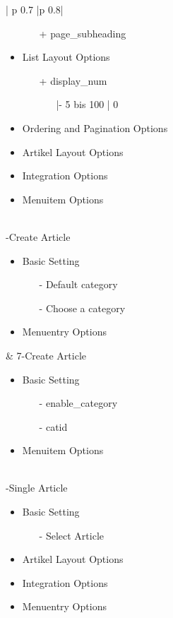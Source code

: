 \begin{minipage}{0.7\textwidth}
\begin{longtable}{| p {0.7\textwidth} |p {0.8\textwidth}|}
\begin{itemize}
\begin{enumerate}
	 \item[+] page\_subheading
	\end{enumerate}
\item List Layout Options
\begin{enumerate}
   	   	\item[+] display\_num
   	   	\begin{enumerate}
   	   				\item[|-] 5 bis 100 | 0
   	   			\end{enumerate}
   	   	\end{enumerate}
\item Ordering and Pagination Options
\item Artikel Layout Options
\item Integration Options
\item Menuitem Options 
\end{itemize}
\\ -Create Article
\begin{itemize}
\item Basic Setting
	\begin{enumerate}
			\item[-] Default category 
			\item[-] Choose a category 
	 \end{enumerate}
\item Menuentry Options
\end{itemize}
&
7-Create Article
\begin{itemize}
\item Basic Setting
	\begin{enumerate}
			\item[-] enable\_category 
			\item[-] catid 
	 \end{enumerate}
\item Menuitem Options
\end{itemize}
\\ -Single Article
\begin{itemize}
	\item Basic  Setting
		\begin{enumerate}
		\item[-] Select Article
		\end{enumerate}
	\item Artikel Layout Options
   	\item Integration Options
   	\item Menuentry Options
  \end{itemize}

\end{longtable}
\end{minipage}
